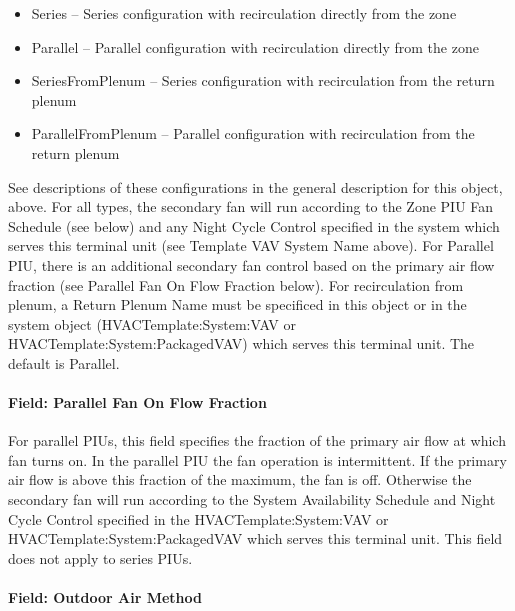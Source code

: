 \begin{itemize}
\item
  Series -- Series configuration with recirculation directly from the zone
\item
  Parallel -- Parallel configuration with recirculation directly from the zone
\item
  SeriesFromPlenum -- Series configuration with recirculation from the return plenum
\item
  ParallelFromPlenum -- Parallel configuration with recirculation from the return plenum
\end{itemize}

See descriptions of these configurations in the general description for this object, above. For all types, the secondary fan will run according to the Zone PIU Fan Schedule (see below) and any Night Cycle Control specified in the system which serves this terminal unit (see Template VAV System Name above). For Parallel PIU, there is an additional secondary fan control based on the primary air flow fraction (see Parallel Fan On Flow Fraction below). For recirculation from plenum, a Return Plenum Name must be specificed in this object or in the system object (HVACTemplate:System:VAV or HVACTemplate:System:PackagedVAV) which serves this terminal unit. The default is Parallel.

\paragraph{Field: Parallel Fan On Flow Fraction}\label{field-parallel-fan-on-flow-fraction}

For parallel PIUs, this field specifies the fraction of the primary air flow at which fan turns on. In the parallel PIU the fan operation is intermittent. If the primary air flow is above this fraction of the maximum, the fan is off. Otherwise the secondary fan will run according to the System Availability Schedule and Night Cycle Control specified in the HVACTemplate:System:VAV or HVACTemplate:System:PackagedVAV which serves this terminal unit. This field does not apply to series PIUs.

\paragraph{Field: Outdoor Air Method}\label{field-outdoor-air-method-9}

